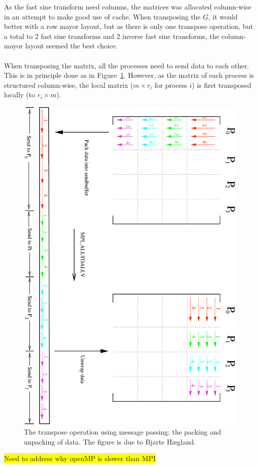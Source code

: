 As the fast sine transform need columns, the matrices was allocated column-wise in an attempt to make good use of cache. When transposing the $\underline{G}$, it would better with a row mayor layout, but as there is only one transpose operation, but a total to 2 fast sine transforms and 2 inverse fast sine transforms, the column-mayor layout seemed the best choice. \\
\\
When transposing the matrix, all the processes need to send data to each other. This is in principle done as in Figure~\ref{fig:mpisend}. However, as the matrix of each process is structured column-wise, the local matrix ($m \times r_i$ for process $i$) is first transposed locally (to $r_i \times m$).
%
\begin{figure}[h!]
\begin{center}
    \includegraphics[angle=90,scale=0.35]{./Figures/matrix_blocktranspose.pdf}
\end{center}
\caption{The transpose operation using message passing: the packing and unpacking of data. The figure is due to Bjarte Hægland.}
\label{fig:mpisend}
\end{figure}




\colorbox{yellow}{Need to address why openMP is slower than MPI}
